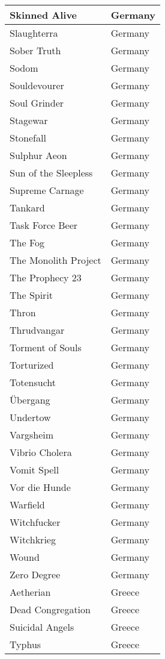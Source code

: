 \documentclass[12pt, a4paper, twoside]{report}
\begin{document}
\begin{center}
\begin{longtable}{|p{5cm}|p{5cm}|}
Skinned Alive & Germany \\ \hline
Slaughterra & Germany \\ \hline
Sober Truth & Germany \\ \hline
Sodom & Germany \\ \hline
Souldevourer & Germany \\ \hline
Soul Grinder & Germany \\ \hline
Stagewar & Germany \\ \hline
Stonefall & Germany \\ \hline
Sulphur Aeon & Germany \\ \hline
Sun of the Sleepless & Germany \\ \hline
Supreme Carnage & Germany \\ \hline
Tankard & Germany \\ \hline
Task Force Beer & Germany \\ \hline
The Fog & Germany \\ \hline
The Monolith Project & Germany \\ \hline
The Prophecy 23 & Germany \\ \hline
The Spirit & Germany \\ \hline
Thron & Germany \\ \hline
Thrudvangar & Germany \\ \hline
Torment of Souls & Germany \\ \hline
Torturized & Germany \\ \hline
Totensucht & Germany \\ \hline
Übergang & Germany \\ \hline
Undertow & Germany \\ \hline
Vargsheim & Germany \\ \hline
Vibrio Cholera & Germany \\ \hline
Vomit Spell & Germany \\ \hline
Vor die Hunde & Germany \\ \hline
Warfield & Germany \\ \hline
Witchfucker & Germany \\ \hline
Witchkrieg & Germany \\ \hline
Wound & Germany \\ \hline
Zero Degree & Germany \\ \hline
Aetherian & Greece \\ \hline
Dead Congregation & Greece \\ \hline
Suicidal Angels & Greece \\ \hline
Typhus & Greece \\ \hline

\end{longtable}
\end{center}
\end{document}
